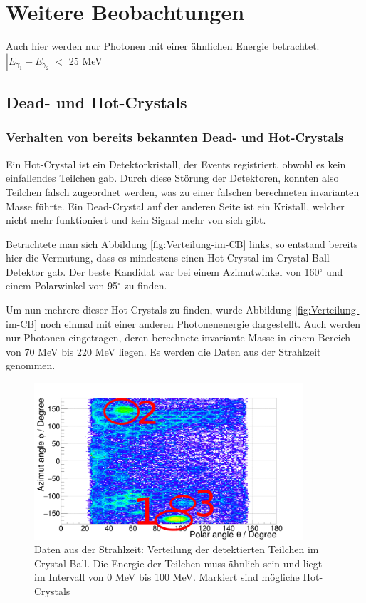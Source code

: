 \documentclass[a4paper,11pt,oneside,final,german,openbib,pdftex]{scrbook}
\begin{document}
{\chapter{Weitere Beobachtungen}
\label{sec:Weitere-Beobachtungen}
Auch hier werden nur Photonen mit einer \"ahnlichen Energie betrachtet. $|E_{\gamma_1}-E_{\gamma_2}|<$ 25 MeV
\section{Dead- und Hot-Crystals}
\subsection{Verhalten von bereits bekannten Dead- und Hot-Crystals}
\label{sec:Bekannte-Dead-Crystals}
Ein Hot-Crystal ist ein Detektorkristall, der Events registriert, obwohl es kein einfallendes Teilchen gab. Durch diese St\"orung der Detektoren, konnten also Teilchen falsch zugeordnet werden, was zu einer falschen berechneten invarianten Masse f\"uhrte. 
Ein Dead-Crystal auf der anderen Seite ist ein Kristall, welcher nicht mehr funktioniert und kein Signal mehr von sich gibt.

Betrachtete man sich Abbildung \ref{fig:Verteilung-im-CB} links, so entstand bereits hier die Vermutung, dass es mindestens einen Hot-Crystal im Crystal-Ball Detektor gab. Der beste Kandidat war bei einem Azimutwinkel von 160$^{\circ}$ und einem Polarwinkel von 95$^{\circ}$ zu finden.

Um nun mehrere dieser Hot-Crystals zu finden, wurde Abbildung \ref{fig:Verteilung-im-CB} noch einmal mit einer anderen Photonenenergie dargestellt. Auch werden nur Photonen eingetragen, deren berechnete invariante Masse in einem Bereich von 70 MeV bis 220 MeV liegen. Es werden die Daten aus der Strahlzeit genommen.

\begin{figure}[h!]
	\begin{center}
		\includegraphics[width=100mm]{NewCalib/Strahlzeit2014/ClusterSize/20172104StrahlzeitClusterSize0Marker}
	\end{center}
	\caption[Strahlzeit: Markierte '\textit{Hot-Crystals}'; Niedrige Energien]{Daten aus der Strahlzeit: Verteilung der detektierten Teilchen im Crystal-Ball. Die Energie der Teilchen muss \"ahnlich sein und liegt im Intervall von 0 MeV bis 100 MeV. Markiert sind m\"ogliche Hot-Crystals}
	\label{fig:Markierte-Hot-Crystals}
\end{figure}

}
\end{document}
